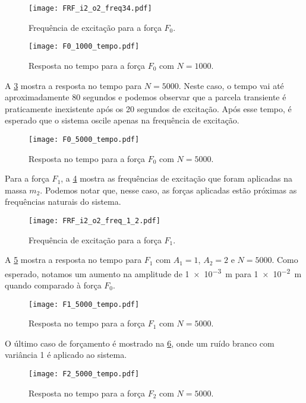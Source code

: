 \begin{figure}
	\centering
	\texttt{[image: FRF\_i2\_o2\_freq34.pdf]}
	\caption{Frequência de excitação para a força $F_0$.}
	\label{fig:FRF_i2_o2_freq34}
\end{figure}

\begin{figure}[h]
	\centering
	\texttt{[image: F0\_1000\_tempo.pdf]}
	\caption{Resposta no tempo para a força $F_0$ com $N=1000$.}
	\label{fig:F0_1000_tempo}
\end{figure}

A \cref{fig:F0_5000_tempo} mostra a resposta no tempo para $N=5000$. Neste caso, o tempo vai até aproximadamente 80 segundos e podemos observar que a parcela transiente é praticamente inexistente após os 20 segundos de excitação. Após esse tempo, é esperado que o sistema oscile apenas na frequência de excitação.

\begin{figure}
	\centering
	\texttt{[image: F0\_5000\_tempo.pdf]}
	\caption{Resposta no tempo para a força $F_0$ com $N=5000$.}
	\label{fig:F0_5000_tempo}
\end{figure}

Para a força $F_1$, a \cref{fig:FRF_i2_o2_freq_1_2} mostra as frequências de excitação que foram aplicadas na massa $m_2$. Podemos notar que, nesse caso, as forças aplicadas estão próximas as frequências naturais do sistema.

\begin{figure}
	\centering
	\texttt{[image: FRF\_i2\_o2\_freq\_1\_2.pdf]}
	\caption{Frequência de excitação para a força $F_1$.}
	\label{fig:FRF_i2_o2_freq_1_2}
\end{figure}

A \cref{fig:F1_5000_tempo} mostra a resposta no tempo para $F_1$ com $ A_1 = 1 $, $ A_2 = 2  $ e $ N=5000 $. Como esperado, notamos um aumento na amplitude de \SI{1e-3}{\m} para \SI{1e-2}{\m} quando comparado à força $ F_0 $.

\begin{figure}
	\centering
	\texttt{[image: F1\_5000\_tempo.pdf]}
	\caption{Resposta no tempo para a força $F_1$ com $N=5000$.}
	\label{fig:F1_5000_tempo}
\end{figure}

O último caso de forçamento é mostrado na \cref{fig:F2_5000_tempo}, onde um ruído branco com variância 1 é aplicado ao sistema.

\begin{figure}[h]
	\centering
	\texttt{[image: F2\_5000\_tempo.pdf]}
	\caption{Resposta no tempo para a força $F_2$ com $N=5000$.}
	\label{fig:F2_5000_tempo}
\end{figure}


